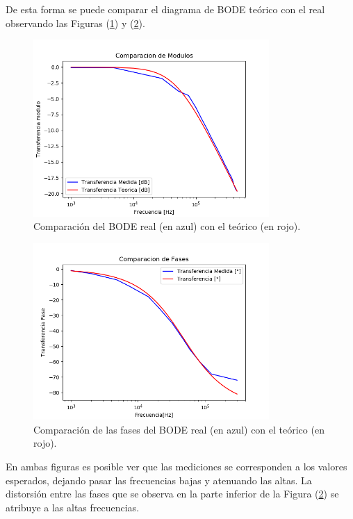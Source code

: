 \documentclass[a4paper]{article}
\begin{document}
De esta forma se puede comparar el diagrama de BODE teórico con el real observando las Figuras (\ref{fig:bodecomparacion}) y (\ref{fig:fasecomparacion}).

\begin{figure}[H]
	\centering
	\includegraphics[width=0.8\textwidth]{BodeRealVsMedido}
\caption{Comparación del BODE real (en azul) con el teórico (en rojo).}
	\label{fig:bodecomparacion}
\end{figure}

\begin{figure}[H]
	\centering
	\includegraphics[width=0.8\textwidth]{FaseRealVsMedido}
\caption{Comparación de las fases del BODE real (en azul) con el teórico (en rojo).}
	\label{fig:fasecomparacion}
\end{figure}

En ambas figuras es posible ver que las mediciones se corresponden a los valores esperados, dejando pasar las frecuencias bajas y atenuando las altas. La distorsión entre las fases que se observa en la parte inferior de la Figura (\ref{fig:fasecomparacion}) se atribuye a las altas frecuencias. 
\end{document}

